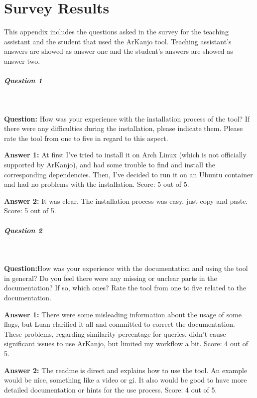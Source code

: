\chapter{Survey Results}

\label{app:survey}

This appendix includes the questions asked in the survey for the teaching assistant and the
student that used the ArKanjo tool. Teaching assistant's answers are showed as answer one and 
the student's answers are showed as answer two.

\paragraph{Question 1}

\

\textbf{Question:} How was your experience with the installation process of the tool? 
If there were any difficulties during the installation, please indicate them. 
Please rate the tool from one to five in regard to this aspect.

\textbf{Answer 1:} At first I've tried to install it on Arch Linux
(which is not officially supported by ArKanjo), and had some trouble to find and install 
the corresponding dependencies. Then, I've decided to run it on an Ubuntu container and 
had no problems with the installation. Score: 5 out of 5.

\textbf{Answer 2:} It was clear. The installation process was easy, just copy and paste. Score: 5 out of 5.

\paragraph{Question 2}

\

\textbf{Question:}How was your experience with the documentation and using the tool in general? 
Do you feel there were any missing or unclear parts in the documentation? If so, which ones?
Rate the tool  from one to five related to the documentation.

\textbf{Answer 1:} There were some misleading information about the usage of some flags, 
but Luan clarified it all and committed to correct the documentation. These problems, 
regarding similarity percentage for queries, didn't cause significant issues to use ArKanjo, 
but limited my workflow a bit. Score: 4 out of 5.

\textbf{Answer 2:} The readme is direct and explains how to use the tool. An example would be nice,
something like a video or gi. It also would be good to have more detailed documentation
or hints for the use process. Score: 4 out of 5.


